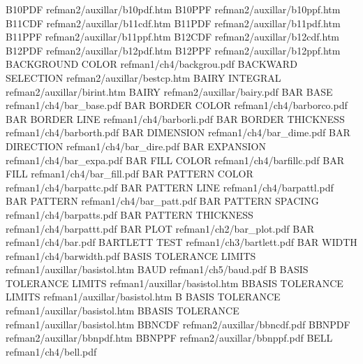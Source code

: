 B10PDF                                  refman2/auxillar/b10pdf.htm
B10PPF                                  refman2/auxillar/b10ppf.htm
B11CDF                                  refman2/auxillar/b11cdf.htm
B11PDF                                  refman2/auxillar/b11pdf.htm
B11PPF                                  refman2/auxillar/b11ppf.htm
B12CDF                                  refman2/auxillar/b12cdf.htm
B12PDF                                  refman2/auxillar/b12pdf.htm
B12PPF                                  refman2/auxillar/b12ppf.htm
BACKGROUND COLOR                        refman1/ch4/backgrou.pdf
BACKWARD SELECTION                      refman2/auxillar/bestcp.htm
BAIRY INTEGRAL                          refman2/auxillar/birint.htm
BAIRY                                   refman2/auxillar/bairy.pdf
BAR BASE                                refman1/ch4/bar_base.pdf
BAR BORDER COLOR                        refman1/ch4/barborco.pdf
BAR BORDER LINE                         refman1/ch4/barborli.pdf
BAR BORDER THICKNESS                    refman1/ch4/barborth.pdf
BAR DIMENSION                           refman1/ch4/bar_dime.pdf
BAR DIRECTION                           refman1/ch4/bar_dire.pdf
BAR EXPANSION                           refman1/ch4/bar_expa.pdf
BAR FILL COLOR                          refman1/ch4/barfillc.pdf
BAR FILL                                refman1/ch4/bar_fill.pdf
BAR PATTERN COLOR                       refman1/ch4/barpattc.pdf
BAR PATTERN LINE                        refman1/ch4/barpattl.pdf
BAR PATTERN                             refman1/ch4/bar_patt.pdf
BAR PATTERN SPACING                     refman1/ch4/barpatts.pdf
BAR PATTERN THICKNESS                   refman1/ch4/barpattt.pdf
BAR PLOT                                refman1/ch2/bar_plot.pdf
BAR                                     refman1/ch4/bar.pdf
BARTLETT TEST                           refman1/ch3/bartlett.pdf
BAR WIDTH                               refman1/ch4/barwidth.pdf
BASIS TOLERANCE LIMITS                  refman1/auxillar/basistol.htm
BAUD                                    refman1/ch5/baud.pdf
B BASIS TOLERANCE LIMITS                refman1/auxillar/basistol.htm
BBASIS TOLERANCE LIMITS                 refman1/auxillar/basistol.htm
B BASIS TOLERANCE                       refman1/auxillar/basistol.htm
BBASIS TOLERANCE                        refman1/auxillar/basistol.htm
BBNCDF                                  refman2/auxillar/bbncdf.pdf
BBNPDF                                  refman2/auxillar/bbnpdf.htm
BBNPPF                                  refman2/auxillar/bbnppf.pdf
BELL                                    refman1/ch4/bell.pdf
